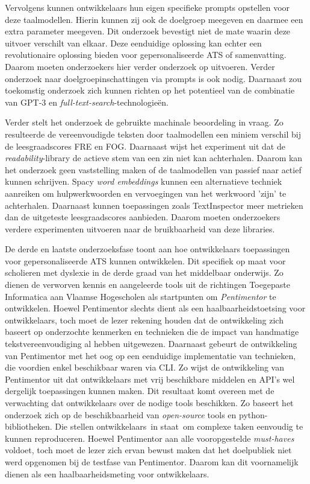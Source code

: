 \medspace

Vervolgens kunnen ontwikkelaars hun eigen specifieke prompts opstellen voor deze taalmodellen. Hierin kunnen zij ook de doelgroep meegeven en daarmee een extra parameter meegeven. Dit onderzoek bevestigt niet de mate waarin deze uitvoer verschilt van elkaar. Deze eenduidige oplossing kan echter een revolutionaire oplossing bieden voor gepersonaliseerde ATS of samenvatting. Daarom moeten onderzoekers hier verder onderzoek op uitvoeren. Verder onderzoek naar doelgroepinschattingen via prompts is ook nodig. Daarnaast zou toekomstig onderzoek zich kunnen richten op het potentieel van de combinatie van GPT-3 en \textit{full-text-search}-technologieën. 

\medspace

Verder stelt het onderzoek de gebruikte machinale beoordeling in vraag. Zo resulteerde de vereenvoudigde teksten door taalmodellen een miniem verschil bij de leesgraadscores FRE en FOG. Daarnaast wijst het experiment uit dat de \textit{readability}-library de actieve stem van een zin niet kan achterhalen. Daarom kan het onderzoek geen vaststelling maken of de taalmodellen van passief naar actief kunnen schrijven. Spacy \textit{word embeddings} kunnen een alternatieve techniek aanreiken om hulpwerkwoorden en vervoegingen van het werkwoord 'zijn' te achterhalen. Daarnaast kunnen toepassingen zoals TextInspector meer metrieken dan de uitgeteste leesgraadscores aanbieden. Daarom moeten onderzoekers verdere experimenten uitvoeren naar de bruikbaarheid van deze libraries. 

\medspace

De derde en laatste onderzoeksfase toont aan hoe ontwikkelaars toepassingen voor gepersonaliseerde ATS kunnen ontwikkelen. Dit specifiek op maat voor scholieren met dyslexie in de derde graad van het middelbaar onderwijs. Zo dienen de verworven kennis en aangeleerde tools uit de richtingen Toegepaste Informatica aan Vlaamse Hogescholen als startpunten om \textit{Pentimentor} te ontwikkelen. Hoewel Pentimentor slechts dient als een haalbaarheidstoetsing voor ontwikkelaars, toch moet de lezer rekening houden dat de ontwikkeling zich baseert op onderzochte kenmerken en technieken die de impact van handmatige tekstvereenvoudiging al hebben uitgewezen. Daarnaast gebeurt de ontwikkeling van Pentimentor met het oog op een eenduidige implementatie van technieken, die voordien enkel beschikbaar waren via CLI. Zo wijst de ontwikkeling van Pentimentor uit dat ontwikkelaars met vrij beschikbare middelen en API's wel dergelijk toepassingen kunnen maken. Dit resultaat komt overeen met de verwachting dat ontwikkelaars over de nodige tools beschikken. Zo baseert het onderzoek zich op de beschikbaarheid van \textit{open-source} tools en python-bibliotheken. Die stellen ontwikkelaars in staat om complexe taken eenvoudig te kunnen reproduceren. Hoewel Pentimentor aan alle vooropgestelde \textit{must-haves} voldoet, toch moet de lezer zich ervan bewust maken dat het doelpubliek niet werd opgenomen bij de testfase van Pentimentor. Daarom kan dit voornamelijk dienen als een haalbaarheidsmeting voor ontwikkelaars.

